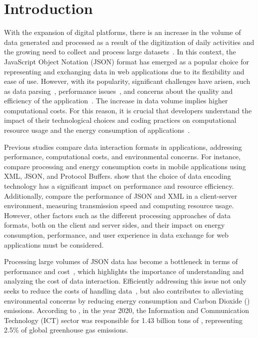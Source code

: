 \section{Introduction}
\label{sec:introducao}

With the expansion of digital platforms, there is an increase in the volume of data generated and processed as a result of the digitization of daily activities and the growing need to collect and process large datasets~\cite{sqlBigData:2022}. In this context, the JavaScript Object Notation (JSON) format has emerged as a popular choice for representing and exchanging data in web applications due to its flexibility and ease of use. However, with its popularity, significant challenges have arisen, such as data parsing~\cite{misonJson:2017}, performance issues~\cite{dataInterchangeMobile:2011}, and concerns about the quality and efficiency of the application~\cite{pageExp:2022}. The increase in data volume implies higher computational costs. For this reason, it is crucial that developers understand the impact of their technological choices and coding practices on computational resource usage and the energy consumption of applications~\cite{pwaEnergy:2022}.


Previous studies compare data interaction formats in applications, addressing performance, computational costs, and environmental concerns. For instance, \citet{dataInterchangeMobile:2011} compare processing and energy consumption costs in mobile applications using XML, JSON, and Protocol Buffers.  \citet{dataConsumptionIot:2021} show that the choice of data encoding technology has a significant impact on performance and resource efficiency. Additionally, \citet{jsonXmlCaseStudy:2009} compare the performance of JSON and XML in a client-server environment, measuring transmission speed and computing resource usage. However, other factors such as the different processing approaches of data formats, both on the client and server sides, and their impact on energy consumption, performance, and user experience in data exchange for web applications must be considered.


Processing large volumes of JSON data has become a bottleneck in terms of performance and cost~\cite{misonJson:2017}, which highlights the importance of understanding and analyzing the cost of data interaction. Efficiently addressing this issue not only seeks to reduce the costs of handling data~\cite{misonJson:2017}, but also contributes to alleviating environmental concerns by reducing energy consumption and Carbon Dioxide () emissions. According to \citet{mvcEnergy:2023}, in the year 2020, the Information and Communication Technology (ICT) sector was responsible for 1.43 billion tons of , representing 2.5\% of global greenhouse gas emissions.


